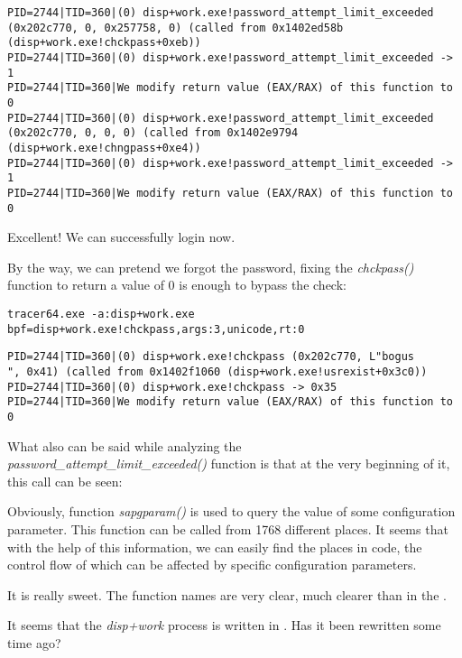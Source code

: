 \begin{lstlisting}
PID=2744|TID=360|(0) disp+work.exe!password_attempt_limit_exceeded (0x202c770, 0, 0x257758, 0) (called from 0x1402ed58b (disp+work.exe!chckpass+0xeb))
PID=2744|TID=360|(0) disp+work.exe!password_attempt_limit_exceeded -> 1
PID=2744|TID=360|We modify return value (EAX/RAX) of this function to 0
PID=2744|TID=360|(0) disp+work.exe!password_attempt_limit_exceeded (0x202c770, 0, 0, 0) (called from 0x1402e9794 (disp+work.exe!chngpass+0xe4))
PID=2744|TID=360|(0) disp+work.exe!password_attempt_limit_exceeded -> 1
PID=2744|TID=360|We modify return value (EAX/RAX) of this function to 0
\end{lstlisting}

Excellent! We can successfully login now.

By the way, we can pretend we forgot the password, fixing the \emph{chckpass()} function to return a value of 0 is enough to bypass the check:

\begin{lstlisting}
tracer64.exe -a:disp+work.exe bpf=disp+work.exe!chckpass,args:3,unicode,rt:0
\end{lstlisting}

\begin{lstlisting}
PID=2744|TID=360|(0) disp+work.exe!chckpass (0x202c770, L"bogus                                   ", 0x41) (called from 0x1402f1060 (disp+work.exe!usrexist+0x3c0))
PID=2744|TID=360|(0) disp+work.exe!chckpass -> 0x35
PID=2744|TID=360|We modify return value (EAX/RAX) of this function to 0
\end{lstlisting}

What also can be said while analyzing the \\
\emph{password\_attempt\_limit\_exceeded()} 
function is that at the very beginning of it, this call can be seen:



Obviously, function \emph{sapgparam()} is used to query the value of some configuration parameter. This function can be called from 1768 different places.
It seems that with the help of this information, we can easily find the places in code, the control flow of which can be affected by specific configuration parameters.

It is really sweet. The function names are very clear, much clearer than in the \oracle. 
\myindex{\Cpp}

It seems that the \emph{disp+work} process is written in \Cpp. Has it been rewritten some time ago?

